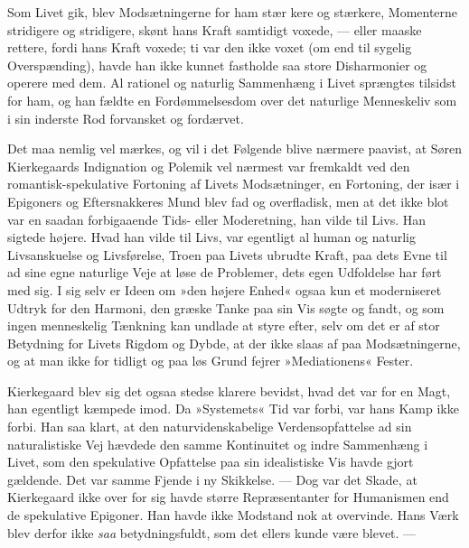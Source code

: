 \documentclass[12pt,a4paper,openany]{book}
\newcommand{\opage}[1]{\marginnote{\footnotesize\textit{[#1]}}}
\begin{document}
Som Livet gik, blev Modsætningerne for ham stær%
\opage{47}kere og stærkere, Momenterne stridigere og stridigere,
skønt hans Kraft samtidigt voxede, --- eller maaske
rettere, fordi hans Kraft voxede; ti var den ikke voxet
(om end til sygelig Overspænding), havde han ikke kunnet
fastholde saa store Disharmonier og operere med dem.
Al rationel og naturlig Sammenhæng i Livet sprængtes
tilsidst for ham, og han fældte en Fordømmelsesdom over
det naturlige Menneskeliv som i sin inderste Rod forvansket
og fordærvet.

Det maa nemlig vel mærkes, og vil i det Følgende
blive nærmere paavist, at Søren Kierkegaards Indignation
og Polemik vel nærmest var fremkaldt ved den romantisk-spekulative
Fortoning af Livets Modsætninger, en
Fortoning, der især i Epigoners og Eftersnakkeres Mund
blev fad og overfladisk, men at det ikke blot var en
saadan forbigaaende Tids- eller Moderetning, han vilde
til Livs. Han sigtede højere. Hvad han vilde til Livs,
var egentligt al human og naturlig Livsanskuelse og
Livsførelse, Troen paa Livets ubrudte Kraft, paa dets
Evne til ad sine egne naturlige Veje at løse de Problemer,
dets egen Udfoldelse har ført med sig. I sig selv
er Ideen om »den højere Enhed« ogsaa kun et moderniseret
Udtryk for den Harmoni, den græske Tanke paa
sin Vis søgte og fandt, og som ingen menneskelig Tænkning
kan undlade at styre efter, selv om det er af stor
Betydning for Livets Rigdom og Dybde, at der ikke
slaas af paa Modsætningerne, og at man ikke for tidligt
og paa løs Grund fejrer »Mediationens« Fester.

Kierkegaard blev sig det ogsaa stedse klarere bevidst,
hvad det var for en Magt, han egentligt kæmpede
imod. Da »Systemets« Tid var forbi, var hans Kamp
ikke forbi. Han saa klart, at den naturvidenskabelige
Verdensopfattelse ad sin naturalistiske Vej hævdede den
samme Kontinuitet og indre Sammenhæng i Livet, som
\opage{48}den spekulative Opfattelse paa sin idealistiske Vis havde
gjort gældende. Det var samme Fjende i ny Skikkelse.
--- Dog var det Skade, at Kierkegaard ikke over for sig
havde større Repræsentanter for Humanismen end de
spekulative Epigoner. Han havde ikke Modstand nok at
overvinde. Hans Værk blev derfor ikke \textit{saa} betydningsfuldt,
som det ellers kunde være blevet. ---
\end{document}
